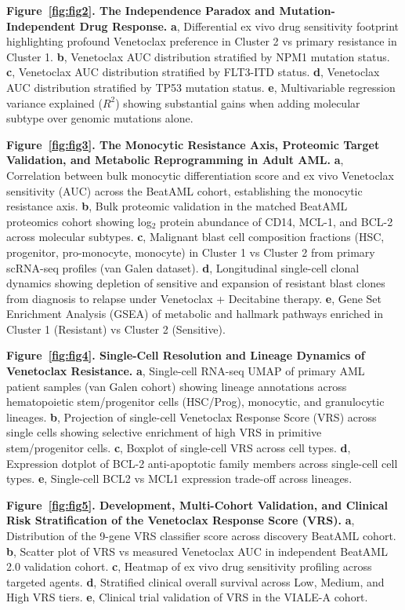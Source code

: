 \documentclass[11pt,a4paper]{article}
\begin{document}
\textbf{Figure~\ref{fig:fig2}. The Independence Paradox and Mutation-Independent Drug Response.} \textbf{a}, Differential ex vivo drug sensitivity footprint highlighting profound Venetoclax preference in Cluster 2 vs primary resistance in Cluster 1. \textbf{b}, Venetoclax AUC distribution stratified by NPM1 mutation status. \textbf{c}, Venetoclax AUC distribution stratified by FLT3-ITD status. \textbf{d}, Venetoclax AUC distribution stratified by TP53 mutation status. \textbf{e}, Multivariable regression variance explained ($R^2$) showing substantial gains when adding molecular subtype over genomic mutations alone.

\textbf{Figure~\ref{fig:fig3}. The Monocytic Resistance Axis, Proteomic Target Validation, and Metabolic Reprogramming in Adult AML.} \textbf{a}, Correlation between bulk monocytic differentiation score and ex vivo Venetoclax sensitivity (AUC) across the BeatAML cohort, establishing the monocytic resistance axis. \textbf{b}, Bulk proteomic validation in the matched BeatAML proteomics cohort showing log$_2$ protein abundance of CD14, MCL-1, and BCL-2 across molecular subtypes. \textbf{c}, Malignant blast cell composition fractions (HSC, progenitor, pro-monocyte, monocyte) in Cluster 1 vs Cluster 2 from primary scRNA-seq profiles (van Galen dataset). \textbf{d}, Longitudinal single-cell clonal dynamics showing depletion of sensitive and expansion of resistant blast clones from diagnosis to relapse under Venetoclax + Decitabine therapy. \textbf{e}, Gene Set Enrichment Analysis (GSEA) of metabolic and hallmark pathways enriched in Cluster 1 (Resistant) vs Cluster 2 (Sensitive).

\textbf{Figure~\ref{fig:fig4}. Single-Cell Resolution and Lineage Dynamics of Venetoclax Resistance.} \textbf{a}, Single-cell RNA-seq UMAP of primary AML patient samples (van Galen cohort) showing lineage annotations across hematopoietic stem/progenitor cells (HSC/Prog), monocytic, and granulocytic lineages. \textbf{b}, Projection of single-cell Venetoclax Response Score (VRS) across single cells showing selective enrichment of high VRS in primitive stem/progenitor cells. \textbf{c}, Boxplot of single-cell VRS across cell types. \textbf{d}, Expression dotplot of BCL-2 anti-apoptotic family members across single-cell cell types. \textbf{e}, Single-cell BCL2 vs MCL1 expression trade-off across lineages.

\textbf{Figure~\ref{fig:fig5}. Development, Multi-Cohort Validation, and Clinical Risk Stratification of the Venetoclax Response Score (VRS).} \textbf{a}, Distribution of the 9-gene VRS classifier score across discovery BeatAML cohort. \textbf{b}, Scatter plot of VRS vs measured Venetoclax AUC in independent BeatAML 2.0 validation cohort. \textbf{c}, Heatmap of ex vivo drug sensitivity profiling across targeted agents. \textbf{d}, Stratified clinical overall survival across Low, Medium, and High VRS tiers. \textbf{e}, Clinical trial validation of VRS in the VIALE-A cohort.
\end{document}
